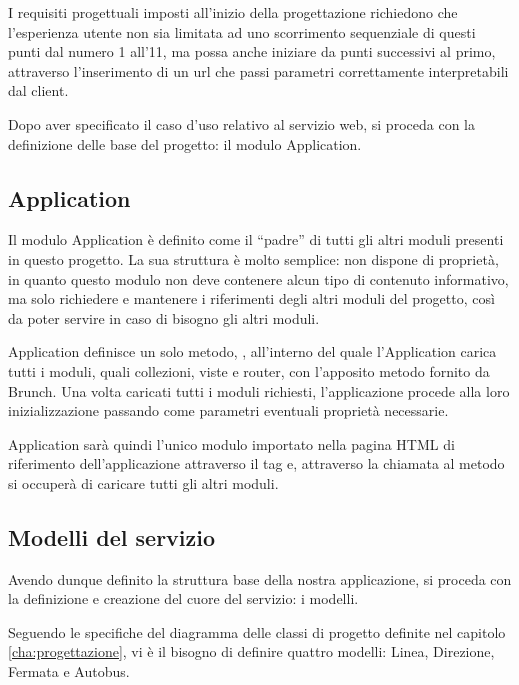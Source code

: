 I requisiti progettuali imposti all'inizio della progettazione richiedono che l'esperienza utente non sia limitata ad uno scorrimento sequenziale di questi punti dal numero 1 all'11, ma possa anche iniziare da punti successivi al primo, attraverso l'inserimento di un url che passi parametri correttamente interpretabili dal client.

Dopo aver specificato il caso d'uso relativo al servizio web, si proceda con la definizione delle base del progetto: il modulo Application.

\subsection{Application} %
\label{sub:application}

Il modulo Application è definito come il ``padre'' di tutti gli altri moduli presenti in questo progetto.
La sua struttura è molto semplice: non dispone di proprietà, in quanto questo modulo non deve contenere alcun tipo di contenuto informativo, ma solo richiedere e mantenere i riferimenti degli altri moduli del progetto, così da poter servire in caso di bisogno gli altri moduli.

Application definisce un solo metodo, , all'interno del quale l'Application carica tutti i moduli, quali collezioni, viste e router, con l'apposito metodo fornito da Brunch. Una volta caricati tutti i moduli richiesti, l'applicazione procede alla loro inizializzazione passando come parametri eventuali proprietà necessarie. 

Application sarà quindi l'unico modulo importato nella pagina HTML di riferimento dell'applicazione attraverso il tag  e, attraverso la chiamata al metodo  si occuperà di caricare tutti gli altri moduli.

\subsection{Modelli del servizio} %
\label{sub:modelli_del_servizio}

Avendo dunque definito la struttura base della nostra applicazione, si proceda con la definizione e creazione del cuore del servizio: i modelli.

Seguendo le specifiche del diagramma delle classi di progetto definite nel capitolo \ref{cha:progettazione}, vi è il bisogno di definire quattro modelli: Linea, Direzione, Fermata e Autobus.

